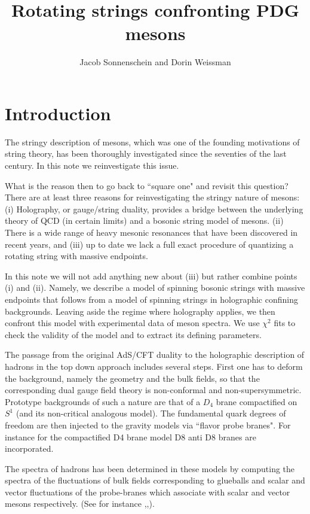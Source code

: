 \documentclass[11pt,a4]{article}
\title{Rotating strings confronting PDG mesons}
\author{Jacob Sonnenschein and Dorin Weissman}
\affiliation{The Raymond and Beverly Sackler School of Physics and Astronomy,\\
	Tel Aviv University, Ramat Aviv 69978, Israel}
\begin{document}
\maketitle
\flushbottom

\section{Introduction}

The stringy description of mesons, which was one of the founding motivations of string theory, has been thoroughly investigated since the seventies of the last century\cite{Collins:book}. In this note we reinvestigate this issue.


What is the reason then to go back to ``square one" and revisit this question? There are at least three reasons for reinvestigating the stringy nature of mesons: (i) Holography, or gauge/string duality, provides a bridge between the underlying theory of QCD (in certain limits) and a bosonic string model of mesons. (ii) There is a wide range of  heavy mesonic resonances that have been discovered in recent years, and (iii) up to date we lack a full exact procedure of quantizing a rotating string with massive endpoints.


In this note we will not add anything new about (iii) but rather combine points (i) and (ii). Namely, we describe a model of spinning bosonic strings with massive endpoints that follows from a model of spinning strings in holographic confining backgrounds. Leaving aside the regime where holography applies, we then confront this model with experimental data of meson spectra. We use $\chi^2$ fits to check the validity of the model and to extract its defining parameters.


The passage from the original AdS/CFT duality to the holographic description of hadrons in the top down approach  includes several steps. First one has to deform the background, namely the geometry and the bulk fields, so that the corresponding dual gauge field theory is non-conformal and non-supersymmetric. Prototype backgrounds of such a nature are that of a $D_4$ brane compactified on $S^1$\cite{Witten:1998zw} (and its non-critical analogous model\cite{Kuperstein:2004yf}). The fundamental quark degrees of freedom are then injected to the gravity models via ``flavor probe branes". For instance for the compactified D4 brane model D8 anti D8 branes are incorporated\cite{SakSug}.


The spectra of hadrons has been determined in these models by computing the spectra of the fluctuations of bulk fields corresponding to glueballs and scalar and vector fluctuations of the probe-branes which associate with scalar and vector mesons respectively. (See for instance \cite{SakSug},\cite{Casero:2005se},\cite{oai:arXiv.org:0806.0152}).
\end{document}
